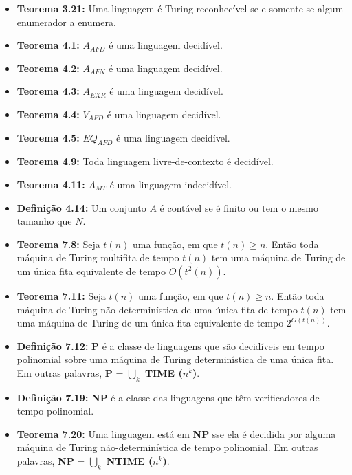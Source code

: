 \documentclass[12pt,a4paper,oneside]{article}
\begin{document}
\begin{itemize}
	\item[] {\bf Teorema 3.21:} Uma linguagem é Turing-reconhecível se e somente se algum enumerador a enumera.
	\item[] {\bf Teorema 4.1:} $A_{AFD}$ é uma linguagem decidível.
	\item[] {\bf Teorema 4.2:} $A_{AFN}$ é uma linguagem decidível.
	\item[] {\bf Teorema 4.3:} $A_{EXR}$ é uma linguagem decidível.
	\item[] {\bf Teorema 4.4:} $V_{AFD}$ é uma linguagem decidível.
	\item[] {\bf Teorema 4.5:} $EQ_{AFD}$ é uma linguagem decidível.
	\item[] {\bf Teorema 4.9:} Toda linguagem livre-de-contexto é decidível.
	\item[] {\bf Teorema 4.11:} $A_{MT}$ é uma linguagem indecidível.
	\item[] {\bf Definição 4.14:} Um conjunto $A$ é contável se é finito ou tem o mesmo tamanho que $N$.
	\item[] {\bf Teorema 7.8: }
	Seja $t(n)$ uma função, em que $t(n) \geq n$. Então toda máquina de Turing multifita de tempo $t(n)$ tem uma máquina de Turing de um única fita equivalente de tempo $O(t^2(n))$.
	\item[] {\bf Teorema 7.11: }
	Seja $t(n)$ uma função, em que $t(n) \geq n$. Então toda máquina de Turing não-determinística de uma única fita de tempo $t(n)$ tem uma máquina de Turing de um única fita equivalente de tempo $2^{O(t(n))}$.	
	\item[] {\bf Definição 7.12: }
	{\bf P} é a classe de linguagens que são decidíveis em tempo polinomial sobre uma máquina de Turing determinística de uma única fita. Em outras palavras, {\bf P} = $\bigcup\limits_{k}$ {\bf TIME ($n^k$)}.
	\item[] {\bf Definição 7.19: }
	{\bf NP} é a classe das linguagens que têm verificadores de tempo polinomial.
	\item[] {\bf Teorema 7.20: }
	Uma linguagem está em {\bf NP} sse ela é decidida por alguma máquina de Turing não-determinística de tempo polinomial.  Em outras palavras, {\bf NP} = $\bigcup\limits_{k}$ {\bf NTIME ($n^k$)}.
\end{itemize}
\end{document}
